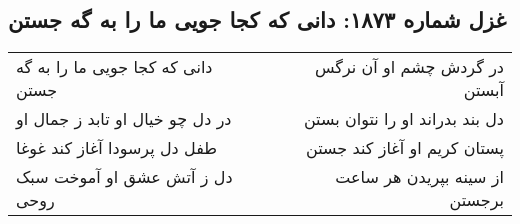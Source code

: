 \begin{center}
\section*{غزل شماره ۱۸۷۳: دانی که کجا جویی ما را به گه جستن}
\label{sec:1873}
\begin{longtable}{l p{0.5cm} r}
دانی که کجا جویی ما را به گه جستن
&&
در گردش چشم او آن نرگس آبستن
\\
در دل چو خیال او تابد ز جمال او
&&
دل بند بدراند او را نتوان بستن
\\
طفل دل پرسودا آغاز کند غوغا
&&
پستان کریم او آغاز کند جستن
\\
دل ز آتش عشق او آموخت سبک روحی
&&
از سینه بپریدن هر ساعت برجستن
\\
\end{longtable}
\end{center}
